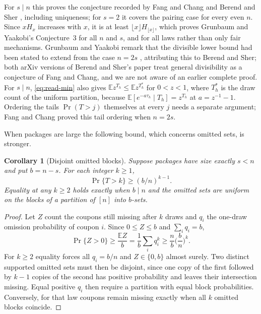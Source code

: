 \documentclass[11pt,a4paper]{article}
\newtheorem{corollary}[theorem]{Corollary}
\theoremstyle{remark}
\newcommand{\E}{\mathbb E}
\begin{document}
For $s\mid n$ this proves the conjecture recorded by Fang and Chang \cite{fang} and Berend and Sher \cite{sher}, including uniqueness; for $s=2$ it covers the pairing case for every even $n$. Since $xH_x$ increases with $x$, it is at least $\lfloor x\rfloor H_{\lfloor x\rfloor}$, which proves Grunbaum and Yaakobi's Conjecture~3 \cite{gy} for all $n$ and $s$, and for all laws rather than only fair mechanisms. Grunbaum and Yaakobi remark that the divisible lower bound had been stated to extend from the case $n=2s$ \cite[Remark~2 and Section~VII]{gy}, attributing this to Berend and Sher; both arXiv versions of Berend and Sher's paper \cite{sher} treat general divisibility as a conjecture of Fang and Chang, and we are not aware of an earlier complete proof. For $s\mid n$, \eqref{eq:read-min} also gives $\E z^{T_h}\le\E z^{T_h^*}$ for $0<z<1$, where $T_h^*$ is the draw count of the uniform partition, because $\E[e^{-a\tau_h}\mid T_h]=z^{T_h}$ at $a=z^{-1}-1$. Ordering the tails $\Pr(T>j)$ themselves at every $j$ needs a separate argument; Fang and Chang \cite{fang} proved this tail ordering when $n=2s$.

When packages are large the following bound, which concerns omitted sets, is stronger.

\begin{corollary}[Disjoint omitted blocks]\label{cor:dualmin}
Suppose packages have size exactly $s<n$ and put $b=n-s$. For each integer $k\ge1$,
\[
 \Pr\{T>k\}\ge(b/n)^{k-1}.
\]
Equality at any $k\ge2$ holds exactly when $b\mid n$ and the omitted sets are uniform on the blocks of a partition of $[n]$ into $b$-sets.
\end{corollary}
\begin{proof}
Let $Z$ count the coupons still missing after $k$ draws and $q_i$ the one-draw omission probability of coupon $i$. Since $0\le Z\le b$ and $\sum_iq_i=b$,
\[
 \Pr\{Z>0\}\ge\frac{\E Z}b=\frac1b\sum_iq_i^k\ge\frac nb\Big(\frac bn\Big)^k .
\]
For $k\ge2$ equality forces all $q_i=b/n$ and $Z\in\{0,b\}$ almost surely. Two distinct supported omitted sets must then be disjoint, since one copy of the first followed by $k-1$ copies of the second has positive probability and leaves their intersection missing. Equal positive $q_i$ then require a partition with equal block probabilities. Conversely, for that law coupons remain missing exactly when all $k$ omitted blocks coincide.
\end{proof}
\end{document}
